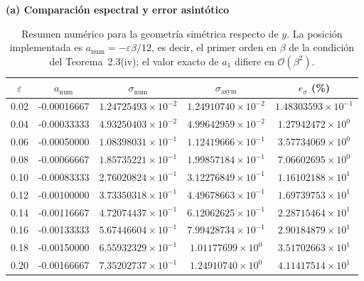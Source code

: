 \documentclass[11pt]{article}
\begin{document}
\begin{table}[!htbp]
\centering
\caption{Resumen numérico para la geometría simétrica respecto de $y$. La posición implementada es $a_{\mathrm{num}}=-\varepsilon\beta/12$, es decir, el primer orden en $\beta$ de la condición del Teorema~2.3(iv); el valor exacto de $a_1$ difiere en $\mathcal{O}(\beta^2)$.}
\label{tab:t23y_summary}
\small
\setlength{\tabcolsep}{5pt}
\textbf{(a) Comparación espectral y error asintótico}\\[0.4em]
\begin{tabular}{@{}ccccc@{}}
\toprule
$\varepsilon$ & $a_{\mathrm{num}}$ & $\sigma_{\mathrm{num}}$ & $\sigma_{\mathrm{asym}}$ & $e_\sigma$ (\%) \\
\midrule
0.02 & -0.00016667 & $1.24725493\times10^{-2}$ & $1.24910740\times10^{-2}$ & $1.48303593\times10^{-1}$ \\
0.04 & -0.00033333 & $4.93250403\times10^{-2}$ & $4.99642959\times10^{-2}$ & $1.27942472\times10^{0}$ \\
0.06 & -0.00050000 & $1.08398031\times10^{-1}$ & $1.12419666\times10^{-1}$ & $3.57734069\times10^{0}$ \\
0.08 & -0.00066667 & $1.85735221\times10^{-1}$ & $1.99857184\times10^{-1}$ & $7.06602695\times10^{0}$ \\
0.10 & -0.00083333 & $2.76020824\times10^{-1}$ & $3.12276849\times10^{-1}$ & $1.16102188\times10^{1}$ \\
0.12 & -0.00100000 & $3.73350318\times10^{-1}$ & $4.49678663\times10^{-1}$ & $1.69739753\times10^{1}$ \\
0.14 & -0.00116667 & $4.72074437\times10^{-1}$ & $6.12062625\times10^{-1}$ & $2.28715464\times10^{1}$ \\
0.16 & -0.00133333 & $5.67446604\times10^{-1}$ & $7.99428734\times10^{-1}$ & $2.90184879\times10^{1}$ \\
0.18 & -0.00150000 & $6.55932329\times10^{-1}$ & $1.01177699\times10^{0}$ & $3.51702663\times10^{1}$ \\
0.20 & -0.00166667 & $7.35202737\times10^{-1}$ & $1.24910740\times10^{0}$ & $4.11417514\times10^{1}$ \\
\bottomrule
\end{tabular}


\end{table}
\end{document}
